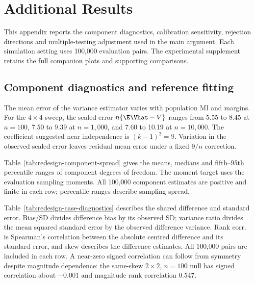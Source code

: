 \chapter{Additional Results}
\label{app:additional-results}

This appendix reports the component diagnostics, calibration sensitivity,
rejection directions and multiple-testing adjustment used in the main
argument. Each simulation setting uses 100,000 evaluation pairs. The
experimental supplement retains the full companion plots and supporting
comparisons.

\section{Component diagnostics and reference fitting}
\label{sec:component-diagnostics}

The mean error of the variance estimator varies with population MI and
margins. For the \(4\times4\) sweep, the scaled error
\(n\{\E\Vhat-V\}\) ranges from 5.55 to 8.45 at \(n=100\),
7.50 to 9.39 at \(n=1{,}000\), and 7.60 to 10.19 at
\(n=10{,}000\). The coefficient suggested near independence is
\((k-1)^2=9\). Variation in the observed scaled error leaves residual
mean error under a fixed \(9/n\) correction.

Table~\ref{tab:redesign-component-spread} gives the means, medians and
fifth--95th percentile ranges of component degrees of freedom. The
moment target uses the evaluation sampling moments. All 100,000
component estimates are positive and finite in each row; percentile
ranges describe sampling spread.

\begin{table}[!htbp]
\centering
\small
\setlength{\tabcolsep}{3pt}
\caption{Sampling spread of component degrees of freedom.}
\label{tab:redesign-component-spread}

\end{table}

Table~\ref{tab:redesign-case-diagnostics} describes the shared difference
and standard error. Bias/SD divides difference bias by its observed SD;
variance ratio divides the mean squared standard error by the observed
difference variance. Rank corr. is Spearman's correlation between the
absolute centred difference and its standard error, and skew describes
the difference estimates. All 100,000 pairs are included in each row.
A near-zero signed correlation can follow from symmetry despite
magnitude dependence: the same-skew \(2\times2\), \(n=100\) null has
signed correlation about \(-0.001\) and magnitude rank correlation 0.547.

